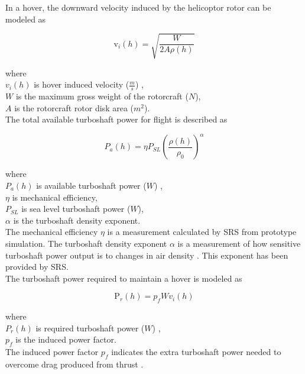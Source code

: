 \documentclass[12pt]{report}
\begin{document}
\noindent In a hover, the downward velocity induced by the helicoptor rotor can be modeled as

\begin{equation} \label{eq:vi}
    \mathrm v_i(h)=\sqrt{\frac{W}{2A\rho(h)}}
\end{equation}

\noindent where\\
    \indent $v_i(h)$ is hover induced velocity ($\frac{m}{s}$) \cite{helidyn},\\
    \indent $W$ is the maximum gross weight of the rotorcraft ($N$),\\
    \indent $A$ is the rotorcraft rotor disk area ($m^2$).\\

\noindent The total available turboshaft power for flight is described as

\begin{equation} \label{eq:P_a}
    P_a(h)=\eta P_{SL}(\frac{\rho(h)}{\rho_0})^\alpha
\end{equation}

\noindent where\\
    \indent $P_a(h)$ is available turboshaft power ($W$) \cite{helidyn},\\
    \indent $\eta$ is mechanical efficiency,\\
    \indent $P_{SL}$ is sea level turboshaft power ($W$),\\
    \indent $\alpha$ is the turboshaft density exponent.\\

\noindent The mechanical efficiency $\eta$ is a measurement
calculated by SRS from prototype simulation. The turboshaft density exponent $\alpha$ is a measurement of how sensitive
turboshaft power output is to changes in air density \cite{helidyn}. This exponent has been provided by SRS.\\
The turboshaft power required to maintain a hover is modeled as

\begin{equation} \label{eq:P_r}
    \mathrm P_r(h)=p_fWv_i(h)
\end{equation}

\noindent where\\
    \indent $P_r(h)$ is required turboshaft power ($W$) \cite{helidyn},\\
    \indent $p_f$ is the induced power factor.\\

\noindent The induced power factor $p_f$ indicates the extra turboshaft
power needed to overcome drag produced from thrust \cite{helidyn}.\\
\end{document}
